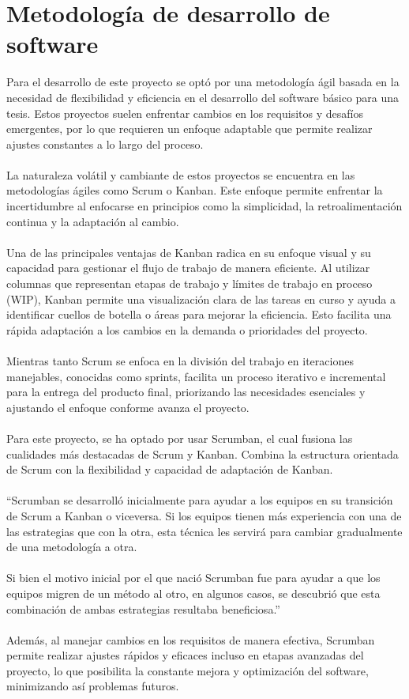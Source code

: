 \section{Metodología de desarrollo de software}
Para el desarrollo de este proyecto se optó por una metodología ágil basada en la  necesidad de flexibilidad y eficiencia en el desarrollo del software básico para una tesis. Estos proyectos suelen enfrentar cambios en los requisitos y desafíos emergentes, por lo que requieren un enfoque adaptable que permite realizar ajustes constantes a lo largo del proceso.
\\ \\
La naturaleza volátil y cambiante de estos proyectos se encuentra en las metodologías ágiles como Scrum o Kanban. Este enfoque permite enfrentar la incertidumbre al enfocarse en principios como la simplicidad, la retroalimentación continua y la adaptación al cambio.
\\ \\
Una de las principales ventajas de Kanban radica en su enfoque visual y su capacidad para gestionar el flujo de trabajo de manera eficiente. Al utilizar columnas que representan etapas de trabajo y límites de trabajo en proceso (WIP), Kanban permite una visualización clara de las tareas en curso y ayuda a identificar cuellos de botella o áreas para mejorar la eficiencia. Esto facilita una rápida adaptación a los cambios en la demanda o prioridades del proyecto.
\\ \\
Mientras tanto Scrum se enfoca en la división del trabajo en iteraciones manejables, conocidas como sprints, facilita un proceso iterativo e incremental para la entrega del producto final, priorizando las necesidades esenciales y ajustando el enfoque conforme avanza el proyecto.
\\ \\
Para este proyecto, se ha optado por usar Scrumban, el cual fusiona las cualidades más destacadas de Scrum y Kanban. Combina la estructura orientada de Scrum con la flexibilidad y capacidad de adaptación de Kanban. 
\\ \\
“Scrumban se desarrolló inicialmente para ayudar a los equipos en su transición de Scrum a Kanban o viceversa. Si los equipos tienen más experiencia con una de las estrategias que con la otra, esta técnica les servirá para cambiar gradualmente de una metodología a otra. 
\\ \\
Si bien el motivo inicial por el que nació Scrumban fue para ayudar a que los equipos migren de un método al otro, en algunos casos, se descubrió que esta combinación de ambas estrategias resultaba beneficiosa.”\cite{p}
\\ \\
Además, al manejar cambios en los requisitos de manera efectiva, Scrumban permite realizar ajustes rápidos y eficaces incluso en etapas avanzadas del proyecto, lo que posibilita la constante mejora y optimización del software, minimizando así problemas futuros.

